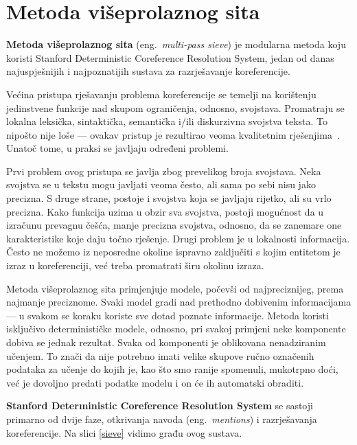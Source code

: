 \documentclass[a4paper,twoside,12pt]{memoir} %
\newcommand{\ti}[1]{\textit{#1\/}}
\newcommand{\tb}{\textbf}
\begin{document}
	\section{Metoda višeprolaznog sita}

	\tb{Metoda višeprolaznog sita} (eng.~\ti{multi-pass sieve}) je modularna metoda koju koristi Stanford Deterministic Coreference Resolution System, jedan od danas najuspješnijih i najpoznatijih sustava za razrješavanje koreferencije.

	Većina pristupa rješavanju problema koreferencije se temelji na korištenju jedinstvene funkcije nad skupom ograničenja, odnosno, svojstava. Promatraju se lokalna leksička, sintaktička, semantička i/ili diskurzivna svojstva teksta. To nipošto nije loše --- ovakav pristup je rezultirao veoma kvalitetnim rješenjima~\cite{haghighi2009simple}. Unatoč tome, u praksi se javljaju određeni problemi.

	Prvi problem ovog pristupa se javlja zbog prevelikog broja svojstava. Neka svojstva se u tekstu mogu javljati veoma često, ali sama po sebi nisu jako precizna. S druge strane, postoje i svojstva koja se javljaju rijetko, ali su vrlo precizna. Kako funkcija uzima u obzir sva svojstva, postoji mogućnost da u izračunu prevagnu češća, manje precizna svojstva, odnosno, da se zanemare one karakteristike koje daju točno rješenje. Drugi problem je u lokalnosti informacija. Često ne možemo iz neposredne okoline ispravno zaključiti s kojim entitetom je izraz u koreferenciji, već treba promatrati širu okolinu izraza.

	Metoda višeprolaznog sita primjenjuje modele, počevši od najpreciznijeg, prema najmanje preciznome. Svaki model gradi nad prethodno dobivenim informacijama --- u svakom se koraku koriste sve dotad poznate informacije. Metoda koristi isključivo determinističke modele, odnosno, pri svakoj primjeni neke komponente dobiva se jednak rezultat. Svaka od komponenti je oblikovana nenadziranim učenjem. To znači da nije potrebno imati velike skupove ručno označenih podataka za učenje do kojih je, kao što smo ranije spomenuli, mukotrpno doći, već je dovoljno predati podatke modelu i on će ih automatski obraditi.

	\bigskip

	\tb{Stanford Deterministic Coreference Resolution System} se sastoji primarno od dvije faze, otkrivanja navoda (eng.~\ti{mentions}) i razrješavanja koreferencije.
	Na slici \ref{sieve} vidimo građu ovog sustava.
\end{document}
